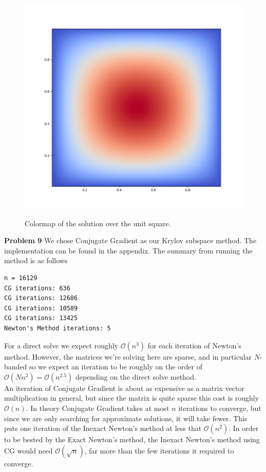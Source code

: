 \documentclass[12pt]{article}
\newcommand{\problem}[1]{\hspace{-4 ex} \large \textbf{Problem #1} }
\begin{document}
\begin{figure}[H]
	\caption{Colormap of the solution over the unit square.}
	\includegraphics[width=1\textwidth]{hwch9_p8_figure_1}
	\label{p8}
	\centering
\end{figure}

\bigbreak

\problem{9} We chose Conjugate Gradient as our Krylov subspace method. The implementation can be found in the appendix. The summary from running the method is as follows
\begin{lstlisting}
n = 16129
CG iterations: 636
CG iterations: 12686
CG iterations: 10589
CG iterations: 13425
Newton's Method iterations: 5
\end{lstlisting}
For a direct solve we expect roughly $\mathcal{O}(n^3)$ for each iteration of Newton's method. However, the matrices we're solving here are sparse, and in particular $N$-banded so we expect an iteration to be roughly on the order of $\mathcal{O}(Nn^2) = \mathcal{O}(n^{2.5})$ depending on the direct solve method.  \\

An iteration of Conjugate Gradient is about as expensive as a matrix vector multiplication in general, but since the matrix is quite sparse this cost is roughly $\mathcal{O}(n)$. In theory Conjugate Gradient takes at most $n$ iterations to converge, but since we are only searching for approximate solutions, it will take fewer. This puts one iteration of the Inexact Newton's method at less that $\mathcal{O}(n^2)$. In order to be bested by the Exact Newton's method, the Inexact Newton's method using CG would need $\mathcal{O}(\sqrt{n})$, far more than the few iterations it required to converge. \\
\end{document}
